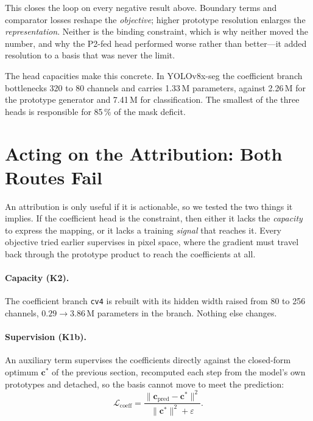 \documentclass[11pt,letterpaper]{article}
\begin{document}
This closes the loop on every negative result above. Boundary terms and
comparator losses reshape the \emph{objective}; higher prototype resolution
enlarges the \emph{representation}. Neither is the binding constraint, which is
why neither moved the number, and why the P2-fed head performed worse rather
than better---it added resolution to a basis that was never the limit.

The head capacities make this concrete. In YOLOv8x-seg the coefficient branch
bottlenecks 320 to 80 channels and carries 1.33\,M parameters, against 2.26\,M
for the prototype generator and 7.41\,M for classification. The smallest of the
three heads is responsible for 85\,\% of the mask deficit.

\section{Acting on the Attribution: Both Routes Fail}
\label{sec:acting}

An attribution is only useful if it is actionable, so we tested the two things
it implies. If the coefficient head is the constraint, then either it lacks the
\emph{capacity} to express the mapping, or it lacks a training \emph{signal}
that reaches it. Every objective tried earlier supervises in pixel space, where
the gradient must travel back through the prototype product to reach the
coefficients at all.

\paragraph{Capacity (K2).} The coefficient branch \texttt{cv4} is rebuilt with
its hidden width raised from 80 to 256 channels, $0.29\to3.86$\,M parameters in
the branch. Nothing else changes.

\paragraph{Supervision (K1b).} An auxiliary term supervises the coefficients
directly against the closed-form optimum $\mathbf{c}^{*}$ of the previous
section, recomputed each step from the model's own prototypes and detached, so
the basis cannot move to meet the prediction:
\begin{equation}
\mathcal{L}_{\text{coeff}}
 = \frac{\lVert \mathbf{c}_{\text{pred}} - \mathbf{c}^{*}\rVert^{2}}
        {\lVert \mathbf{c}^{*}\rVert^{2} + \varepsilon}.
\end{equation}
\end{document}
